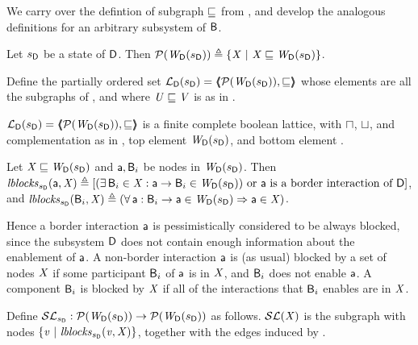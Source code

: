 We carry over the defintion of subgraph $\subg$ from , and develop the analogous definitions for an arbitrary subsystem \DS
of $\B$.


\begin{definition} \label{defn:wsetOfSubgraphsLoc}
Let $\sD$ be a state of $\DS$. Then 
$\lwfgS{B}{\sD}{\DS} \df  \set{ \XS \stt \XS \subg \lwfg{B}{\sD}{\DS} }$.
\end{definition}

\begin{definition} \label{defn:wflatticeLoc}
Define the partially ordered set 
$\llat{\B}{\sD}{\DS}  = \tpl{ \lwfgS{B}{\sD}{\DS},  \subg }$ 
whose elements are all the subgraphs of 
, and where  $\US \subg \VS$ is as in .   
\end{definition}

\begin{proposition} \label{prop:isALatticeLoc}
$\llat{\B}{\sD}{\DS}  = \tpl{ \lwfgS{B}{\sD}{\DS},  \subg }$
 is a finite complete boolean lattice, with $\meet$, $\join$, and complementation as in 
, top element $\lwfg{B}{\sD}{\DS}$, and bottom element \ewfg.
\end{proposition}

\begin{definition} \label{defn:blocksLoc}
Let $\XS \subg \lwfg{\B}{\sD}{\DS}$ and $\act, \B_i$ be nodes in $\lwfg{B}{\sD}{\DS}$. Then 
$\lblocks{\sD}{\act}{\XS} \df
[ (\ex \B_i \in \XS : \act \ar \B_i \in \lwfg{B}{\sD}{\DS})
   \mbox{ or $\act$ is a border interaction of $\DS$} ]$, and 
$\lblocks{\sD}{\B_i}{\XS} \df (\fa \act : \B_i \ar \act \in \lwfg{B}{\sD}{\DS} \imp \act \in \XS)$.
\end{definition}
Hence a border interaction $\act$ is pessimistically considered to be always blocked, since
the subsystem $\DS$ does not contain enough information about the enablement of $\act$.
A non-border interaction $\act$ is (as usual) blocked by a set of nodes $\XS$ if some participant $\B_i$ of 
$\act$ is in $\XS$, and $\B_i$ does not enable $\act$.
A component $\B_i$ is blocked by $\XS$ if all of the interactions that $\B_i$ enables are in $\XS$.


\begin{definition}[$\lSFsymb$] \label{defn:scFixLoc}
Define $\lSFsymb_{\sD}:  \lwfgS{B}{\sD}{\DS}  \to  \lwfgS{B}{\sD}{\DS}$ as follows.
$\lSF{\XS}$ is the subgraph with nodes $\set{\ndv \stt \lblocks{\sD}{\ndv}{\XS} }$, together with the edges induced by .
\end{definition}

